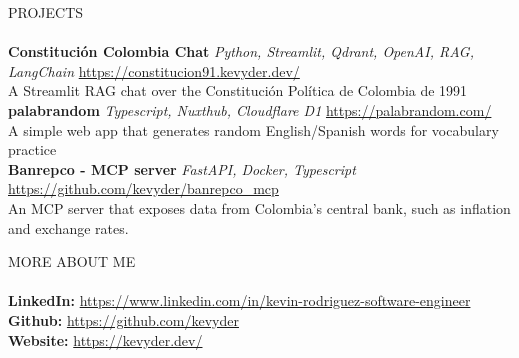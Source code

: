 \documentclass[a4paper]{article}
\newcommand{\lineunder} {
    \vspace*{-8pt} \\
    \hspace*{-18pt} \hrulefill \\
}
\newcommand{\header} [1] {
    {\hspace*{-18pt}\vspace*{6pt} \textsc{#1}}
    \vspace*{-6pt} \lineunder
}
\begin{document}
\header{PROJECTS}
{\textbf{Constitución Colombia Chat}} {\sl Python, Streamlit, Qdrant, OpenAI, RAG, LangChain} \hfill \url{https://constitucion91.kevyder.dev/}\\
A Streamlit RAG chat over the Constitución Política de Colombia de 1991\\
\vspace*{1mm}
{\textbf{palabrandom}} {\sl Typescript, Nuxthub, Cloudflare D1} \hfill \url{https://palabrandom.com/}\\
A simple web app that generates random English/Spanish words for vocabulary practice\\
\vspace*{1mm}
{\textbf{Banrepco - MCP server}} {\sl FastAPI, Docker, Typescript} \hfill \url{https://github.com/kevyder/banrepco_mcp}\\
An MCP server that exposes data from Colombia's central bank, such as inflation and exchange rates.\\
\vspace*{1mm}

\header{MORE ABOUT ME}
\textbf{LinkedIn:} \url{https://www.linkedin.com/in/kevin-rodriguez-software-engineer}\\
\textbf{Github:} \url{https://github.com/kevyder}\\
\textbf{Website:} \url{https://kevyder.dev/}\\
\end{document}
